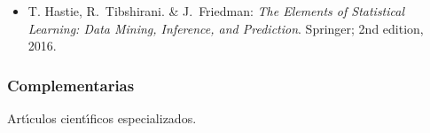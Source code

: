 \documentclass[10 pt]{article}
\begin{document}
 \begin{itemize}[itemsep=0em]

   
 \item{T. {\sc Hastie}, R.\ {\sc Tibshirani}. \& J.\ {\sc Friedman}: {\em
       The Elements of Statistical Learning: Data Mining, Inference,
       and Prediction}. Springer; 2nd edition, 2016.}
   
\end{itemize}

\subsubsection{Complementarias}

Art\'{\i}culos cient\'{\i}ficos especializados.

\label{final} %


\end{document}

